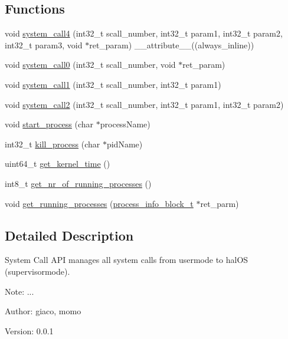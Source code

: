 \subsection*{Functions}
\begin{CompactItemize}
\item 
void \hyperlink{group___h_s_y_s_t_e_m___a_p_i_gb225a2aa0d2d8bcaa2536fa20c5a5a58}{system\_\-call4} (int32\_\-t scall\_\-number, int32\_\-t param1, int32\_\-t param2, int32\_\-t param3, void $\ast$ret\_\-param) \_\-\_\-attribute\_\-\_\-((always\_\-inline))
\item 
void \hyperlink{group___h_s_y_s_t_e_m___a_p_i_gc2a14d9e7b11a7aadcbe3e2fecb920b8}{system\_\-call0} (int32\_\-t scall\_\-number, void $\ast$ret\_\-param)
\item 
void \hyperlink{group___h_s_y_s_t_e_m___a_p_i_g9d47c8a4ca7ec749557ea6462f8c9fc8}{system\_\-call1} (int32\_\-t scall\_\-number, int32\_\-t param1)
\item 
void \hyperlink{group___h_s_y_s_t_e_m___a_p_i_g33d0bfaec0c957c63e5eecd9b2957a21}{system\_\-call2} (int32\_\-t scall\_\-number, int32\_\-t param1, int32\_\-t param2)
\item 
void \hyperlink{group___h_s_y_s_t_e_m___a_p_i_g9d888d0cd06a14252c4b3358ad2e8fdd}{start\_\-process} (char $\ast$processName)
\item 
int32\_\-t \hyperlink{group___h_s_y_s_t_e_m___a_p_i_g13bb69d9873dac8fb09bc47becdda0a4}{kill\_\-process} (char $\ast$pidName)
\item 
uint64\_\-t \hyperlink{group___h_s_y_s_t_e_m___a_p_i_gdbf1c32e05601efd0bc50077ef0b74d2}{get\_\-kernel\_\-time} ()
\item 
int8\_\-t \hyperlink{group___h_s_y_s_t_e_m___a_p_i_gc60fbbb40b86f6d30216c28a1627dd7a}{get\_\-nr\_\-of\_\-running\_\-processes} ()
\item 
void \hyperlink{group___h_s_y_s_t_e_m___a_p_i_ge906df6a1d1c0e47401b8296a8487f86}{get\_\-running\_\-processes} (\hyperlink{group___h_s_y_s_t_e_m___a_p_i_g3be61222bdb3a1adfbf7720dec596851}{process\_\-info\_\-block\_\-t} $\ast$ret\_\-parm)
\end{CompactItemize}


\subsection{Detailed Description}
System Call API manages all system calls from usermode to halOS (supervisormode). 

\begin{Desc}
\item[Note:]... \end{Desc}
\begin{Desc}
\item[Author:]giaco, momo \end{Desc}
\begin{Desc}
\item[Version:]0.0.1 \end{Desc}


